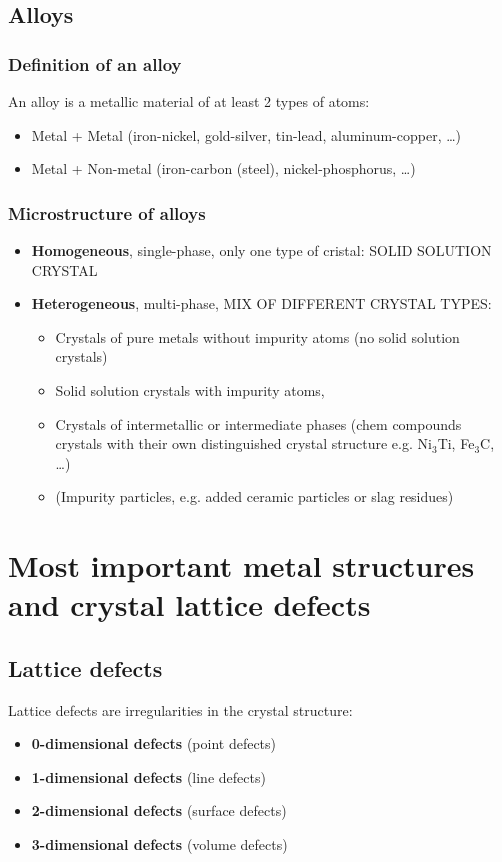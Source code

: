 \documentclass{article}
\begin{document}
\newpage
\subsection{Alloys}
\subsubsection{Definition of an alloy}
An alloy is a metallic material of at least 2 types of atoms:
\begin{itemize}
  \item Metal + Metal (iron-nickel, gold-silver, tin-lead, aluminum-copper, \dots)
  \item Metal + Non-metal (iron-carbon (steel), nickel-phosphorus, \dots)
\end{itemize}

\subsubsection{Microstructure of alloys}
\begin{itemize}
  \item \textbf{Homogeneous}, single-phase, only one type of cristal: SOLID SOLUTION CRYSTAL
  \item \textbf{Heterogeneous}, multi-phase, MIX OF DIFFERENT CRYSTAL TYPES:
  \begin{itemize}
    \item Crystals of pure metals without impurity atoms (no solid solution crystals)
    \item Solid solution crystals with impurity atoms,
    \item Crystals of intermetallic or intermediate phases (chem compounds crystals with their own distinguished crystal structure e.g. Ni$_3$Ti, Fe$_3$C, \dots)
    \item (Impurity particles, e.g. added ceramic particles or slag residues)
  \end{itemize}
\end{itemize}

\section{Most important metal structures and crystal lattice defects}
\subsection{Lattice defects}
Lattice defects are irregularities in the crystal structure:
\begin{itemize}
  \item \textbf{0-dimensional defects} (point defects)
  \item \textbf{1-dimensional defects} (line defects)
  \item \textbf{2-dimensional defects} (surface defects)
  \item \textbf{3-dimensional defects} (volume defects)
\end{itemize}
\end{document}
